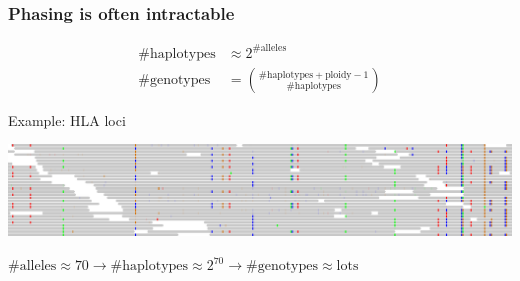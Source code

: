 \documentclass{beamer}
\begin{document}
\begin{frame}
\frametitle{Phasing is often intractable}

\begin{align*}
\#\text{haplotypes} &\approx 2^{\text{\#alleles}} \\
\#\text{genotypes} &= \binom{\#\text{haplotypes} + \text{ploidy} - 1}{\#\text{haplotypes}}
\end{align*}

\begin{exampleblock}{Example: HLA loci}

\begin{center}
    \includegraphics[width=\linewidth]{images/hla_phasing_clear}
\end{center}

\centerline{$\#\text{alleles} \approx 70 \rightarrow \#\text{haplotypes} \approx 2^{70} \rightarrow \#\text{genotypes} \approx \text{lots}$}

\end{exampleblock}

\end{frame}

\end{document}
